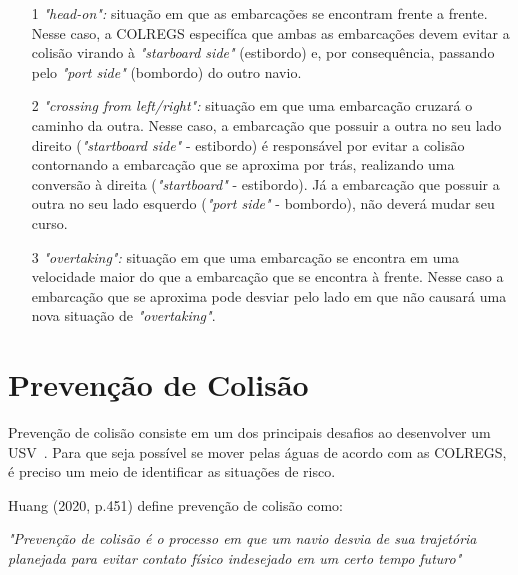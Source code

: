         \begin{enumerate}
            \item [1] \textit{"head-on":} situação em que as embarcações se encontram frente a frente. Nesse caso, a COLREGS especifíca que ambas as embarcações devem evitar a colisão virando à \textit{"starboard side"} (estibordo) e, por consequência, passando pelo \textit{"port side"} (bombordo) do outro navio.
            
            \item [2] \textit{"crossing from left/right":} situação em que uma embarcação cruzará o caminho da outra. Nesse caso, a embarcação que possuir a outra no seu lado direito (\textit{"startboard side"} - estibordo) é responsável por evitar a colisão contornando a embarcação que se aproxima por trás, realizando uma conversão à direita (\textit{"startboard"} - estibordo). Já a embarcação que possuir a outra no seu lado esquerdo (\textit{"port side"} - bombordo), não deverá mudar seu curso.
            
            \item [3] \textit{"overtaking":} situação em que uma embarcação se encontra em uma velocidade maior do que a embarcação que se encontra à frente. Nesse caso a embarcação que se aproxima pode desviar pelo lado em que não causará uma nova situação de \textit{"overtaking"}.
        \end{enumerate}
        
    
    \section{Prevenção de Colisão}\label{subchap2:prev_col}
        
        Prevenção de colisão consiste em um dos principais desafios ao desenvolver um USV~\cite{JURAK2020}. Para que seja possível se mover pelas águas de acordo com as COLREGS, é preciso um meio de identificar as situações de risco.
        
        Huang (2020, p.451) define prevenção de colisão como:
        \begin{directcite}
            \textit{"Prevenção de colisão é o processo em que um navio desvia de sua trajetória planejada para evitar contato físico indesejado em um certo tempo futuro"}
        \end{directcite}
        
